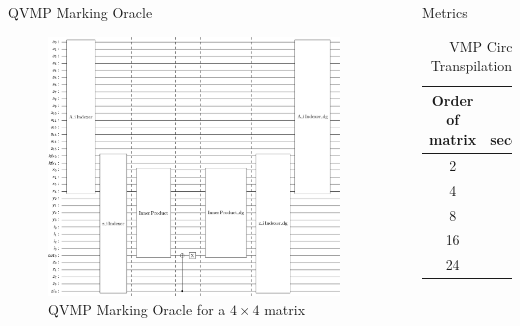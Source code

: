 \documentclass[final]{beamer}
\newlength{\sepwidth}
\newlength{\colwidth}
\newcommand{\separatorcolumn}{\begin{column}{\sepwidth}\end{column}}
\begin{document}
\begin{frame}[t]
\begin{columns}[t]
\begin{column}{\colwidth}
  \begin{block}{QVMP Marking Oracle}
    \begin{figure}
  \centering
  \includegraphics[scale=0.5]{../paper/results/oracle_circuit_4x4.png} 
  \caption{QVMP Marking Oracle for a $4 \times 4$ matrix}
  \label{fig:marking_oracle_4x4}
\end{figure}
  \end{block}
\end{column}

\separatorcolumn

\begin{column}{\colwidth}
  \begin{block}{Metrics}
    \begin{table}[t]
      \centering
      \begin{tabular}{c r}
       \toprule
        \textbf{Order of matrix} & \textbf{Time (in seconds)} \\
       \midrule
        2 & 0.24 \\
        4 & 0.81 \\
        8 & 2.38 \\ 
        16 & 27.48 \\
        24 & 66.20 \\
        \bottomrule
      \end{tabular}
      \caption{VMP Circuit Transpilation Stats}
      \label{table:transpilation_stats}
    \end{table}


\end{block}
\end{column}
\end{columns}
\end{frame}
\end{document}
